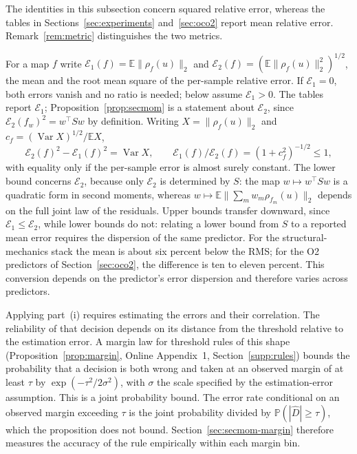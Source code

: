 \documentclass[twoside,11pt]{article}
\begin{document}
The identities in this subsection concern squared relative error, whereas
the tables in Sections~\ref{sec:experiments} and~\ref{sec:oco2} report mean
relative error. Remark~\ref{rem:metric} distinguishes the two metrics.

\begin{remark}\label{rem:metric}
For a map $f$ write
$\mathcal E_1(f)=\mathbb E\|\rho_f(u)\|_2$ and
$\mathcal E_2(f)=(\mathbb E\|\rho_f(u)\|_2^2)^{1/2}$, the mean and the root
mean square of the per-sample relative error. If $\mathcal E_1=0$, both errors vanish and no ratio is needed; below assume $\mathcal E_1>0$. The tables report
$\mathcal E_1$; Proposition~\ref{prop:secmom} is a statement about
$\mathcal E_2$, since $\mathcal E_2(f_w)^2=w^\top Sw$ by definition. Writing
$X=\|\rho_f(u)\|_2$ and $c_f=(\operatorname{Var}X)^{1/2}/\mathbb EX$,
\[
\mathcal E_2(f)^2-\mathcal E_1(f)^2=\operatorname{Var}X,
\qquad
\mathcal E_1(f)/\mathcal E_2(f)=(1+c_f^2)^{-1/2}\le1 ,
\]
with equality only if the per-sample error is almost surely constant. The
lower bound concerns $\mathcal E_2$,
because only $\mathcal E_2$ is determined by $S$: the map
$w\mapsto w^\top Sw$ is a quadratic form in second moments, whereas
$w\mapsto\mathbb E\|\sum_m w_m\rho_{f_m}(u)\|_2$ depends on the full joint law
of the residuals. Upper bounds transfer downward, since
$\mathcal E_1\le\mathcal E_2$, while lower bounds do not: relating a lower bound from
$S$ to a reported mean error requires the dispersion of the same
predictor. For the structural-mechanics stack the mean is about six percent
below the RMS; for the O2 predictors of Section~\ref{sec:oco2}, the difference
is ten to eleven percent. This conversion depends on the predictor's error dispersion and therefore
varies across predictors.
\end{remark}

Applying part~(i) requires estimating the errors and their correlation.
The reliability of that decision depends on its distance from the threshold
relative to the estimation error. A margin law for threshold rules of this shape
(Proposition~\ref{prop:margin}, Online Appendix~1, Section~\ref{supp:rules}) bounds the
probability that a decision is both wrong and taken at an observed margin
of at least $\tau$ by $\exp(-\tau^{2}/2\sigma^{2})$, with $\sigma$ the
scale specified by the estimation-error assumption. This is a joint
probability bound. The error rate conditional on an observed margin
exceeding $\tau$ is the joint probability divided by
$\mathbb P(|\widehat D|\ge\tau)$, which the proposition does not bound.
Section~\ref{sec:secmom-margin} therefore measures the accuracy of the
rule empirically within each margin bin.
\end{document}
